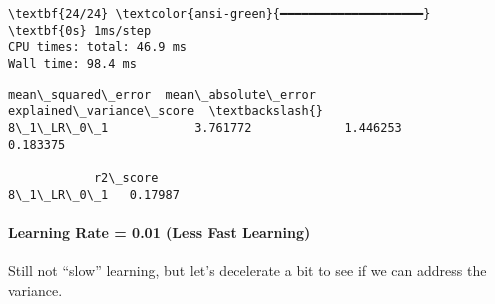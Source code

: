 \documentclass[11pt]{article}
\makeatletter
\newcommand{\boxspacing}{\kern\kvtcb@left@rule\kern\kvtcb@boxsep}
\newcommand{\prompt}[4]{
        {\ttfamily\llap{{\color{#2}[#3]:\hspace{3pt}#4}}\vspace{-\baselineskip}}
    }
\makeatother
\begin{document}
    \begin{Verbatim}[commandchars=\\\{\}]
\textbf{24/24} \textcolor{ansi-green}{━━━━━━━━━━━━━━━━━━━━} \textbf{0s} 1ms/step
CPU times: total: 46.9 ms
Wall time: 98.4 ms
    \end{Verbatim}

            \begin{tcolorbox}[breakable, size=fbox, boxrule=.5pt, pad at break*=1mm, opacityfill=0]
\prompt{Out}{outcolor}{77}{\boxspacing}
\begin{Verbatim}[commandchars=\\\{\}]
            mean\_squared\_error  mean\_absolute\_error  explained\_variance\_score  \textbackslash{}
8\_1\_LR\_0\_1            3.761772             1.446253                  0.183375

            r2\_score
8\_1\_LR\_0\_1   0.17987
\end{Verbatim}
\end{tcolorbox}
        
    \paragraph{Learning Rate = 0.01 (Less Fast
Learning)}\label{learning-rate-0.01-less-fast-learning}

Still not ``slow'' learning, but let's decelerate a bit to see if we can
address the variance.
\end{document}
